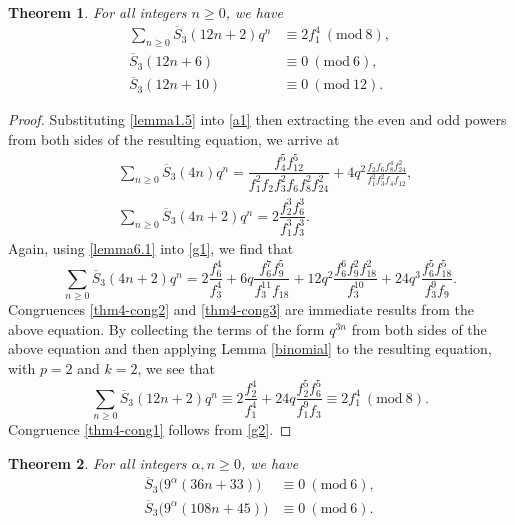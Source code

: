 \documentclass[12pt]{amsart}
\theoremstyle{plain}
\newtheorem{theorem}{Theorem}[section]
\theoremstyle{definition}
\begin{document}
\begin{theorem} \label{thm4} For all integers  $n\geq 0$, we have
\begin{align}
\sum_{n\geq 0} \overline{S}_{3}(12n+2) q^{n} &\equiv  2f_{1}^{4} \ (\mathrm{mod} \ 8), \label{thm4-cong1}\\
\overline{S}_{3}(12n+6) &\equiv  0 \ (\mathrm{mod} \ 6), \label{thm4-cong2}\\
\overline{S}_{3}(12n+10) &\equiv  0 \ (\mathrm{mod} \ 12). \label{thm4-cong3}
\end{align}
\end{theorem}

\begin{proof} Substituting \eqref{lemma1.5} into \eqref{a1} then extracting the even and odd powers from both sides of the resulting equation, we arrive at
\begin{align}
&\sum_{n \geq 0} \overline{S}_{3}(4n) q^{n} = \dfrac{f_{4}^{5} f_{12}^{5}}{f_{1}^{2} f_{2} f_{3}^{2} f_{6} f_{8}^{2} f_{24}^{2}} + 4q^{2} \frac{f_{2} f_{6} f_{8}^{4} f_{24}^{2}}{f_{1}^{2} f_{3}^{2} f_{4} f_{12}}, \label{g01}\\
&\sum_{n \geq 0} \overline{S}_{3}(4n+2) q^{n} = 2\dfrac{f_{2}^{3} f_{6}^{3}}{f_{1}^{3} f_{3}^{3}}. \label{g1}
\end{align}
Again, using \eqref{lemma6.1} into \eqref{g1}, we find that
\[
\sum_{n \geq 0} \overline{S}_{3}(4n+2) q^{n} = 2 \frac{f_{6}^{4}}{f_{3}^{4}} + 6q \frac{f_{6}^{7} f_{9}^{5}}{f_{3}^{11} f_{18}} + 12q^{2} \frac{f_{6}^{6} f_{9}^{2} f_{18}^{2}}{f_{3}^{10}} + 24q^{3} \frac{f_{6}^{5} f_{18}^{5}}{f_{3}^{9} f_{9}}.
\]
Congruences \eqref{thm4-cong2} and \eqref{thm4-cong3} are immediate results from the above equation. By collecting the terms of the form $q^{3n}$ from both sides of the above equation and then applying Lemma \ref{binomial} to the resulting equation, with $p=2$ and $k=2$, we see that
\begin{equation}
\sum_{n \geq 0} \overline{S}_{3}(12n+2) q^{n} \equiv 2 \frac{f_{2}^{4}}{f_{1}^{4}} + 24q \frac{f_{2}^{5} f_{6}^{5}}{f_{1}^{9} f_{3}} \equiv 2f_{1}^{4} \ (\mathrm{mod} \ 8). \label{g2}
\end{equation}
Congruence \eqref{thm4-cong1} follows from \eqref{g2}.
\end{proof}






\begin{theorem} \label{thm6} For all integers  $\alpha,n\geq 0$, we have
\begin{align}
\overline{S}_{3} \big( 9^{\alpha}(36n+33) \big) &\equiv  0 \ (\mathrm{mod} \ 6),  \label{thm6-cong1}\\
\overline{S}_{3} \big( 9^{\alpha}(108n+45) \big) &\equiv  0 \ (\mathrm{mod} \ 6). \label{thm6-cong2}
\end{align}
\end{theorem}
\end{document}
